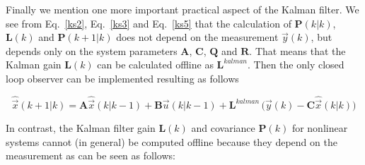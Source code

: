 \documentclass[11pt,a4paper,oneside]{book}
\numberwithin{equation}{section}
\theoremstyle{it}
\theoremstyle{definition}
\begin{document}
Finally we mention one more important practical aspect of the Kalman filter. We 
see from Eq.~\eqref{ks2}, Eq.~\eqref{ks3} and Eq.~\eqref{ks5} that the 
calculation of $\mathbf{P}\left(k|k\right)$, $\mathbf{L}(k)$ and 
$\mathbf{P}\left(k+1|k\right)$ does not depend on the measurement $\vec{y}(k)$, 
but depends only on the system parameters $\mathbf{A}$, $\mathbf{C}$, 
$\mathbf{Q}$ and $\mathbf{R}$. That means that the Kalman gain $\mathbf{L}(k)$ 
can be calculated offline as $\mathbf{L}^{kalman}$. Then the only closed loop 
observer can be implemented resulting as follows
\begin{mybox}
	\begin{equation}
		\hat{\vec{x}}\left(k+1|k\right) = \mathbf{A} 
		\hat{\vec{x}}\left(k|k-1\right) + \mathbf{B} \vec{u}\left(k|k-1\right) 
		+ \mathbf{L}^{kalman}\, \Big(\vec{y}(k) - 
		\mathbf{C}\hat{\vec{x}}\left(k|k\right)\Big)
	\end{equation}
\end{mybox}
In contrast, the Kalman filter gain $\mathbf{L}(k)$ and covariance 
$\mathbf{P}(k)$ for nonlinear systems cannot (in general) be computed offline 
because they depend on the measurement as can be seen as follows:
\end{document}
